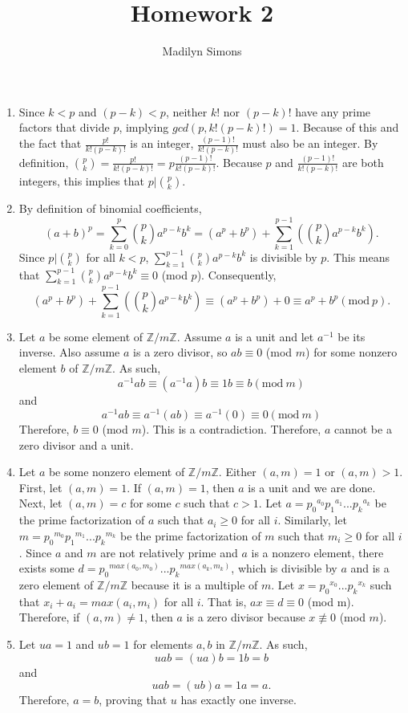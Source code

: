 \documentclass{article}
\title{Homework 2}
\author{Madilyn Simons}
\date{}
\begin{document}
\maketitle

\begin{enumerate}

\item Since $k < p$ and $(p-k) < p$, neither $k!$ nor $(p-k)!$ have any prime
factors that divide $p$, implying $gcd(p, k!(p-k)!) = 1$.
Because of this and the fact that $\frac{p!}{k!(p-k)!}$ is an integer,
$\frac{(p-1)!}{k!(p-k)!}$ must also be an integer.
By definition, $\binom{p}{k} = \frac{p!}{k!(p-k)!} = p\frac{(p-1)!}{k!(p-k)!}$.
Because $p$ and $\frac{(p-1)!}{k!(p-k)!}$ are both integers, this implies that
$p \vert \binom{p}{k}$.

\item By definition of binomial coefficients,
\[
(a+b)^p = \sum_{k=0}^{p} \binom{p}{k} a^{p-k}b^k = (a^p + b^p) +
\sum_{k=1}^{p-1} (\binom{p}{k} a^{p-k}b^k).
\]
Since $p \vert \binom{p}{k}$ for all $k < p$,
$\sum_{k=1}^{p-1} \binom{p}{k} a^{p-k}b^k$ is divisible
by $p$.  This means that $\sum_{k=1}^{p-1} \binom{p}{k} a^{p-k}b^k \equiv 0$ (mod $p$).
Consequently,
\[
(a^p + b^p) + \sum_{k=1}^{p-1} (\binom{p}{k} a^{p-k}b^k) \equiv (a^p + b^p) + 0
\equiv a^p + b ^p (\textrm{mod}\ p).
\]

\item Let $a$ be some element of $\mathbb{Z}/m\mathbb{Z}$.  Assume $a$ is a unit
and let $a^{-1}$ be its inverse.  Also assume $a$ is a zero divisor, so
$ab \equiv 0$ (mod $m$) for some nonzero element $b$ of $\mathbb{Z}/m\mathbb{Z}$.
As such,
\[
a^{-1}ab \equiv (a^{-1}a)b \equiv 1b \equiv b (\textrm{mod}\ m)
\]
and
\[
a^{-1}ab \equiv a^{-1}(ab) \equiv a^{-1}(0) \equiv 0 (\textrm{mod}\ m)
\]
Therefore, $b \equiv 0$ (mod $m$).  This is a contradiction.  Therefore, $a$ cannot
be a zero divisor and a unit.

\item Let $a$ be some nonzero element of $\mathbb{Z}/m\mathbb{Z}$.  Either $(a,m) = 1$
or $(a,m) > 1$.  First, let $(a,m) = 1$.  If $(a,m) = 1$, then $a$ is a unit
and we are done.  Next, let $(a, m) = c$ for some $c$ such that $c > 1$.
Let $a = {p_0}^{a_0}{p_1}^{a_1} ... {p_k}^{a_k}$ be the prime factorization of
$a$ such that $a_i \geq 0$ for all $i$.
Similarly, let $m = {p_0}^{m_0}{p_1}^{m_1} ... {p_k}^{m_k}$ be the prime factorization of
$m$ such that $m_i \geq 0$ for all $i$.
Since $a$ and $m$ are not relatively prime and $a$ is a nonzero element, there exists
some $d = {p_0}^{max(a_0, m_0)} ... {p_k}^{max(a_k, m_k)}$, which is divisible by $a$
and is a zero element of $\mathbb{Z}/m\mathbb{Z}$ because it is a multiple of $m$.
Let $x = {p_0}^{x_0} ... {p_k}^{x_k}$ such that ${x_i}+{a_i} = max(a_i, m_i)$
for all $i$.  That is, $ax \equiv d \equiv 0$ (mod m).
Therefore, if $(a, m) \neq 1$, then $a$ is a zero divisor because $x \not\equiv 0$ (mod $m$).

\item Let $ua = 1$ and $ub = 1$ for elements $a, b$ in $\mathbb{Z}/m\mathbb{Z}$.
As such,
\[
uab = (ua)b = 1b = b
\]
and
\[
uab = (ub)a = 1a = a.
\]
Therefore, $a = b$, proving that $u$ has exactly one inverse.

\end{enumerate}
\end{document}
